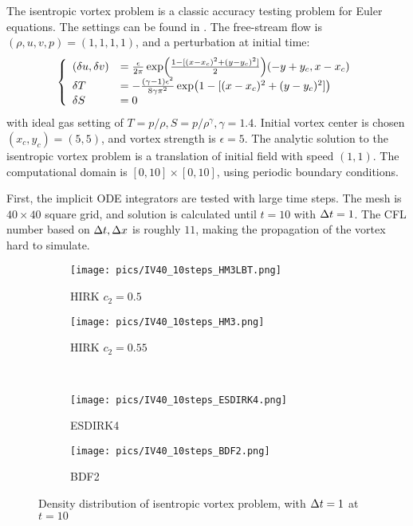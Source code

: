 \documentclass[preprint,12pt]{elsarticle}
\begin{document}
The isentropic vortex problem is a classic
accuracy testing problem for Euler equations.
The settings can be found in \cite{hu1999weighted_WENO}.
The free-stream flow is $(\rho,u,v,p)=(1,1,1,1)$,
and a perturbation at initial time:
\begin{equation}
    \left\{
    \begin{array}[2]{ll}
        (\delta u, \delta v) & = \frac{\epsilon}{2\pi}\exp(\frac{1-[(x-x_c)^2+(y-y_c)^2]}{2})(-y+y_c,x-x_c) \\
        \delta T             & = - \frac{(\gamma-1)\epsilon^2}{8\gamma\pi^2}\exp(1-[(x-x_c)^2+(y-y_c)^2])   \\
        \delta S             & = 0                                                                          \\
    \end{array}
    \right.
\end{equation}
with ideal gas setting of $T = p/\rho, S= p/\rho^\gamma, \gamma =1.4$.
Initial vortex center is chosen $(x_c,y_c)=(5,5)$,
and vortex strength is $\epsilon = 5$.
The analytic solution to the isentropic vortex problem is a
translation of initial field with speed $(1,1)$.
The computational domain is $[0,10]\times[0,10]$,
using periodic boundary conditions.

First, the implicit ODE integrators are tested with large
time steps.
The mesh is $40\times40$ square grid,
and solution is calculated until $t=10$ with $\mathrm\Delta t=1$.
The CFL number based on $\mathrm\Delta t, \mathrm\Delta x$ is roughly $11$,
making the propagation of the vortex hard to
simulate.

\begin{figure}[htbp]
    \centering
    \begin{subfigure}{0.5\textwidth}
        \texttt{[image: pics/IV40\_10steps\_HM3LBT.png]}
        \caption[]{HIRK $c_2=0.5$}
        \label{sfig:IV10Step_HM3LBT}
    \end{subfigure}\hfill
    \begin{subfigure}{0.5\textwidth}
        \texttt{[image: pics/IV40\_10steps\_HM3.png]}
        \caption[]{HIRK $c_2=0.55$}
        \label{sfig:IV10Step_HM3}
    \end{subfigure}\\
    \begin{subfigure}{0.5\textwidth}
        \texttt{[image: pics/IV40\_10steps\_ESDIRK4.png]}
        \caption[]{ESDIRK4}
        \label{sfig:IV10Step_ESDIRK4}
    \end{subfigure}\hfill
    \begin{subfigure}{0.5\textwidth}
        \texttt{[image: pics/IV40\_10steps\_BDF2.png]}
        \caption[]{BDF2}
        \label{sfig:IV10Step_BDF2}
    \end{subfigure}
    \caption{Density distribution of isentropic vortex problem, with $\mathrm\Delta t = 1$ at $t=10$}
    \label{fig:IV10Step}
\end{figure}
\end{document}
